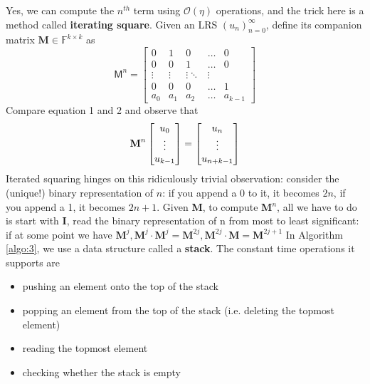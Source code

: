 \documentclass{article}
\newcommand{\bigO}{\mathcal{O}}
\begin{document}
Yes, we can compute the $n^{th}$ term using $\bigO(\eta)$ operations, and the trick here is a method called \textbf{iterating square}. Given an LRS $(u_n)_{n=0}^\infty$, define its companion matrix $\mathbf{M}\in\mathbb{F}^{k \times k}$ as
\begin{equation}
\mathsf{M}^n = \begin{bmatrix}
0 & 1 & 0 & \dots & 0 \\
0 & 0 & 1 & \dots & 0 \\
\vdots & \vdots & \vdots \ddots & \vdots \\
0 & 0 & 0 & \dots & 1 \\
a_0 & a_1 & a_2 & \dots & a_{k-1} 
\end{bmatrix}
\end{equation}
Compare equation 1 and 2 and observe that 
\begin{equation}
    \text{\textbf{M}}^{n} \begin{bmatrix}
    u_0 \\
    \vdots \\
    u_{k-1}\\
    \end{bmatrix} = 
    \begin{bmatrix}
    u_n\\
    \vdots\\
    u_{n+k-1} 
    \end{bmatrix}
\end{equation}
Iterated squaring hinges on this ridiculously trivial observation: consider the (unique!) binary representation of $n$: if you append a 0 to it, it becomes $2n$, if you append a 1, it becomes $2n + 1$.
\medskip
\newline
Given \textbf{M}, to compute \textbf{M}$^{n}$, all we have to do is start with \textbf{I}, read the binary representation of n from most to least significant: if at some point we have $\mathbf{M}^j, \mathbf{M}^j\cdot \mathbf{M}^j =\mathbf{M}^{2j}, \mathbf{M}^{2j}\cdot \mathbf{M} =\mathbf{M}^{2j+1}$ 
\medskip
\newline
In Algorithm \ref{algo:3}, we use a data structure called a \textbf{stack}. The constant time operations it supports
are
\begin{itemize}
    \item  pushing an element onto the top of the stack
    \item  popping an element from the top of the stack (i.e. deleting the topmost element)
    \item reading the topmost element
    \item checking whether the stack is empty
\end{itemize}
\end{document}
